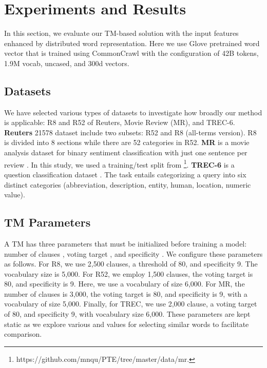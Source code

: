 \documentclass[11pt]{article}
\begin{document}
\section{Experiments and Results}\label{exp}
In this section, we evaluate our TM-based solution with the input features enhanced by distributed word representation. Here we use Glove pretrained word vector that is trained using CommonCrawl with the configuration of 42B tokens, 1.9M vocab, uncased, and 300d vectors. \subsection{Datasets}
We have selected various types of datasets to investigate how broadly our method is applicable: R8 and R52 of Reuters, Movie Review (MR), and TREC-6.   \textbf{ Reuters} 21578 dataset include two subsets: R52 and R8 (all-terms version). R8 is divided into 8 sections while there are 52 categories in R52. 
    \textbf{MR} is a movie analysis dataset for binary sentiment classification with just one sentence per review \cite{10.3115/1219840.1219855}. In this study, we used a training/test split from \cite{jianPTE}\footnote{https://github.com/mnqu/PTE/tree/master/data/mr.}.
    \textbf{TREC-6} is a question classification dataset \cite{li2002}. The task entails categorizing a query into six distinct categories (abbreviation, description, entity, human, location, numeric value). 



\subsection{TM Parameters}
A TM has three parameters that must be initialized before training a model: number of clauses , voting target , and specificity . We configure these parameters as follows. For R8, we use 2,500 clauses, a threshold of 80, and specificity 9. The vocabulary size is 5,000. For R52, we employ  1,500 clauses, the voting target is 80, and specificity is 9. Here, we use a vocabulary of size 6,000. For MR, the number of clauses is 3,000, the voting target is 80, and specificity is 9, with a vocabulary of size 5,000. Finally, for TREC, we use 2,000 clause, a voting target of 80, and specificity 9, with vocabulary size 6,000. These parameters are kept static as we explore various  and  values for selecting similar words to facilitate comparison. 
\end{document}
